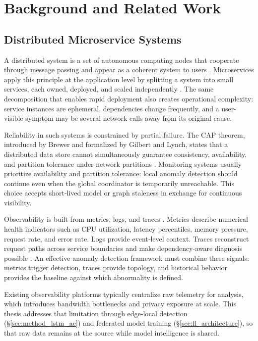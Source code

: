 \chapter{Background and Related Work}
\label{ch:background}

\section{Distributed Microservice Systems}
\label{sec:bg_distributed_systems}

A distributed system is a set of autonomous computing nodes that cooperate
through message passing and appear as a coherent system to users
\cite{tanenbaum2007distributed, coulouris2011distributed}. Microservices apply
this principle at the application level by splitting a system into small
services, each owned, deployed, and scaled independently
\cite{newman2015building, dragoni2017microservices}. The same decomposition
that enables rapid deployment also creates operational complexity: service
instances are ephemeral, dependencies change frequently, and a user-visible
symptom may be several network calls away from its original cause.

Reliability in such systems is constrained by partial failure. The CAP theorem,
introduced by Brewer and formalized by Gilbert and Lynch, states that a
distributed data store cannot simultaneously guarantee consistency,
availability, and partition tolerance under network partitions
\cite{brewer2000towards, gilbert2002brewer}. Monitoring systems usually
prioritize availability and partition tolerance: local anomaly detection should
continue even when the global coordinator is temporarily unreachable. This
choice accepts short-lived model or graph staleness in exchange for continuous
visibility.
\label{subsec:bg_cap}

Observability is built from metrics, logs, and traces
\cite{kalloniatis2020microservices_observability}. Metrics describe numerical
health indicators such as CPU utilization, latency percentiles, memory pressure,
request rate, and error rate. Logs provide event-level context. Traces reconstruct
request paths across service boundaries and make dependency-aware diagnosis
possible \cite{sigelman2010dapper}. An effective anomaly detection framework
must combine these signals: metrics trigger detection, traces provide topology,
and historical behavior provides the baseline against which abnormality is
defined.

Existing observability platforms typically centralize raw telemetry for
analysis, which introduces bandwidth bottlenecks and privacy exposure at scale.
This thesis addresses that limitation through edge-local detection
(\S\ref{sec:method_lstm_ae}) and federated model training
(\S\ref{sec:fl_architecture}), so that raw data remains at the source while
model intelligence is shared.


